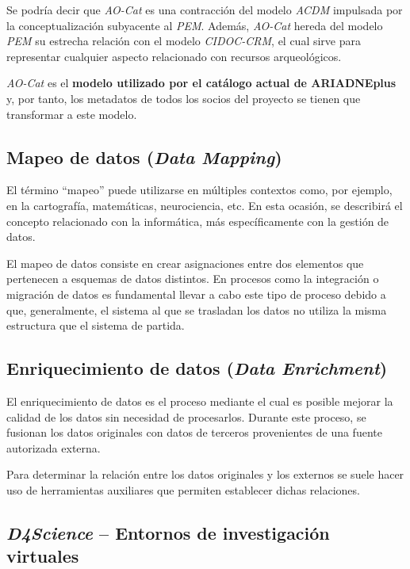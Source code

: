 Se podría decir que \emph{AO-Cat} es una
contracción del modelo \emph{ACDM} impulsada por la conceptualización
subyacente al \emph{PEM}. Además, \emph{AO-Cat} hereda del modelo \emph{PEM} su estrecha
relación con el modelo \emph{CIDOC-CRM}, el cual sirve para representar
cualquier aspecto relacionado con recursos arqueológicos.

\emph{AO-Cat} es el \textbf{modelo utilizado por el catálogo actual de ARIADNEplus} y,
por tanto, los metadatos de todos los socios del proyecto se tienen que transformar a este
modelo.

\subsection{Mapeo de datos (\emph{Data Mapping})}

El término ``mapeo'' puede utilizarse en múltiples contextos como, por
ejemplo, en la cartografía, matemáticas, neurociencia, etc. En esta
ocasión, se describirá el concepto relacionado con la informática, más
específicamente con la gestión de datos.

El mapeo de datos consiste en crear asignaciones entre dos elementos que
pertenecen a esquemas de datos distintos. En procesos como la
integración o migración de datos es fundamental llevar a cabo este tipo
de proceso debido a que, generalmente, el sistema al que se trasladan
los datos no utiliza la misma estructura que el sistema de partida.


\subsection{Enriquecimiento de datos (\emph{Data Enrichment})}

El enriquecimiento de datos es el proceso mediante el cual es posible
mejorar la calidad de los datos sin necesidad de procesarlos. Durante
este proceso, se fusionan los datos originales con datos de terceros
provenientes de una fuente autorizada externa. 

Para determinar la relación entre los datos originales y los externos se suele hacer uso de
herramientas auxiliares que permiten establecer dichas relaciones.


\subsection{\emph{D4Science} -- Entornos de investigación virtuales}

